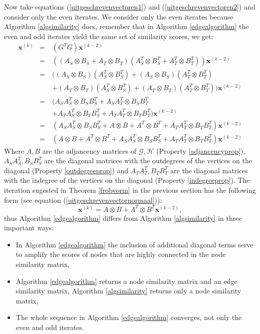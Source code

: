 \documentclass[a4paper,11pt]{report}
\newcommand{\graf}{\mathscr{G}}
\newcommand{\grafeen}{\mathscr{H}}
\begin{document}
Now take equations (\ref{uitgeschrevenvectoren1}) and 
(\ref{uitgeschrevenvectoren2}) and consider only the even iterates. We consider only the even iterates because Algorithm \ref{algsimilarity} does, 
remember that in Algorithm \ref{edgealgorithm} the even and odd iterates yield 
the same set of similarity scores, we get:
\begin{eqnarray*}
  \mathbf{x}^{(k)} &=& (G^TG)\mathbf{x}^{(k-2)}\\
  &=& ((A_S\otimes B_S + A_T \otimes B_T)(A^T_S \otimes B^T_S + A^T_T \otimes 
  B^T_T))\mathbf{x}^{(k-2)}\\
  &=& ((A_S\otimes B_S)(A^T_S \otimes B^T_S) + (A_S\otimes B_S)(A^T_T \otimes 
  B^T_T) \\
  &\quad& + (A_T \otimes B_T)(A^T_S \otimes B^T_S) + (A_T \otimes B_T)(A^T_T \otimes 
  B^T_T))\mathbf{x}^{(k-2)}\\
  &=& (A_S A^T_S \otimes B_SB^T_S + A_SA^T_T \otimes B_SB^T_T \\
  &\quad& + A_TA^T_S \otimes 
  B_TB^T_S + A_TA^T_T\otimes B_TB^T_T)\mathbf{x}^{(k-2)}\\
  &=& (A_S A^T_S \otimes B_SB^T_S + A \otimes B + A^T \otimes B^T + A_TA^T_T\otimes 
  B_TB^T_T)\mathbf{x}^{(k-2)}\\
  &=& (A \otimes B + A^T \otimes B^T + A_S A^T_S \otimes B_SB^T_S + A_TA^T_T\otimes 
  B_TB^T_T)\mathbf{x}^{(k-2)}
\end{eqnarray*}
Where $A, B$ are the adjancency matrices of $\graf, \grafeen$ (Property 
\ref{adjancencyprop}), 
$A_S A^T_S, B_S B^T_S$ are the diagonal matrices with the outdegrees of the vertices 
on the diagonal (Property \ref{outdegreeprop}) and $A_TA^T_T, 
  B_TB^T_T$ are the diagonal matrices with the indegree of the vertices on the 
  diagonal (Property \ref{indegreeprop}). The iteration sugested in Theorem \ref{frobvorm} 
  in the previous section has the following form (see equation 
  (\ref{uitgeschrevenvectornormaal})):
  $$\mathbf{x}^{(k)} = A \otimes B + A^T \otimes B^T\mathbf{x}^{(k-2)},$$
thus Algorithm \ref{edgealgorithm} differs from Algorithm \ref{algsimilarity} in three important ways:
\begin{itemize}
  \item  In Algorithm \ref{edgealgorithm} the inclusion of additional diagonal terms serve to amplify the scores of 
nodes that are highly connected in the node similarity matrix,
\item  Algorithm \ref{edgealgorithm} returns a node similarity matrix and an edge similarity matrix, Algorithm \ref{algsimilarity}
returns only a node similarity matrix,
\item The whole sequence in Algorithm \ref{edgealgorithm} converges, not only 
the even and odd iterates.

\end{itemize}
  
\end{document}
